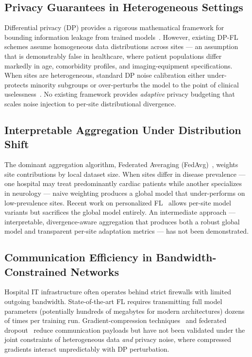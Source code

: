 \documentclass[11pt,a4paper]{article}
\begin{document}
{\subsection{Privacy Guarantees in Heterogeneous Settings}

Differential privacy (DP) provides a rigorous mathematical framework for bounding
information leakage from trained models~\cite{abadi2016}. However, existing DP-FL schemes
assume homogeneous data distributions across sites — an assumption that is demonstrably
false in healthcare, where patient populations differ markedly in age, comorbidity profiles,
and imaging-equipment specifications. When sites are heterogeneous, standard DP noise
calibration either under-protects minority subgroups or over-perturbs the model to the point
of clinical uselessness~\cite{li2020}. No existing framework provides \emph{adaptive}
privacy budgeting that scales noise injection to per-site distributional divergence.

\subsection{Interpretable Aggregation Under Distribution Shift}

The dominant aggregation algorithm, Federated Averaging (FedAvg)~\cite{mcmahan2017},
weights site contributions by local dataset size. When sites differ in disease prevalence —
one hospital may treat predominantly cardiac patients while another specializes in
neurology — naive weighting produces a global model that under-performs on low-prevalence
sites. Recent work on personalized FL~\cite{fallah2020} allows per-site model variants but
sacrifices the global model entirely. An intermediate approach — interpretable,
divergence-aware aggregation that produces both a robust global model and transparent
per-site adaptation metrics — has not been demonstrated.

\subsection{Communication Efficiency in Bandwidth-Constrained Networks}

Hospital IT infrastructure often operates behind strict firewalls with limited outgoing
bandwidth. State-of-the-art FL requires transmitting full model parameters (potentially
hundreds of megabytes for modern architectures) dozens of times per training run.
Gradient-compression techniques~\cite{lin2018} and federated dropout~\cite{caldas2018}
reduce communication payloads but have not been validated under the joint constraints of
heterogeneous data \emph{and} privacy noise, where compressed gradients interact
unpredictably with DP perturbation.

}
\end{document}
